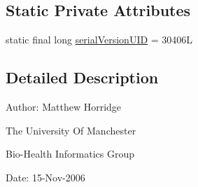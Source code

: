 \subsection*{Static Private Attributes}
\begin{DoxyCompactItemize}
\item 
static final long \hyperlink{classuk_1_1ac_1_1manchester_1_1cs_1_1owl_1_1owlapi_1_1_abstract_in_mem_o_w_l_ontology_factory_a9d28d9314a19f0cb4c391ad705abf200}{serial\-Version\-U\-I\-D} = 30406\-L
\end{DoxyCompactItemize}


\subsection{Detailed Description}
Author\-: Matthew Horridge\par
 The University Of Manchester\par
 Bio-\/\-Health Informatics Group\par
 Date\-: 15-\/\-Nov-\/2006\par
\par
 

